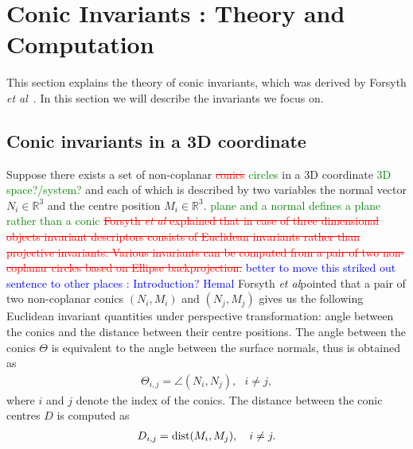 \documentclass{bmvc2k}
\newcommand{\revise}[2]{\textcolor{red}{\sout{#1}} \textcolor{blue}{#2}}  %
\newcommand{\hemal}[2]{\textcolor{red}{\sout{#1}} \textcolor{green}{#2}}
\def\etal{\emph{et al}\bmvaOneDot}
\begin{document}
\section{Conic Invariants : Theory and Computation}
\label{Sec:ConicInv}
This section explains the theory of conic invariants, which was derived by Forsyth \etal~\cite{forsyth_91}. In this section we will describe the invariants we focus on. 

\subsection{Conic invariants in a 3D coordinate}\label{ssec:conicInv3D}
Suppose there exists a set of non-coplanar \hemal{conics}{circles} in a 3D coordinate \hemal{}{3D space?/system?} and each of which is described by two variables the normal vector $N_i \in \mathbb{R}^3$ and the centre position $M_i \in \mathbb{R}^3$.\hemal{}{plane and a normal defines a plane rather than a conic}
\revise{Forsyth \etal \cite{forsyth_91} explained that in case of three dimensional objects invariant descriptors consists of Euclidean invariants rather than projective invariants. 
Various invariants can be computed from a pair of two non-coplanar circles based on Ellipse backprojection. }
{better to move this striked out sentence to other places : Introduction?  Hemal}
Forsyth \etal pointed that a pair of two non-coplanar conics $(N_i,M_i)$ and $(N_j,M_j)$ gives us the following Euclidean invariant quantities under perspective transformation: angle between the conics and the distance between their centre positions.
The angle between the conics $\Theta$ is equivalent to the angle between the surface normals, thus is obtained as
\begin{align}
\Theta_{i,j} = \angle(N_i,N_j),~~~i \neq j,
\label{eq:invTheta3d}
\end{align}
where $i$ and $j$ denote the index of the conics.
The distance between the conic centres $D$ is computed as
\begin{align}
D_{i,j} = {\rm dist}(M_i,M_j),~~~i \neq j.
\label{eq:invD3d}
\end{align} 
\end{document}
